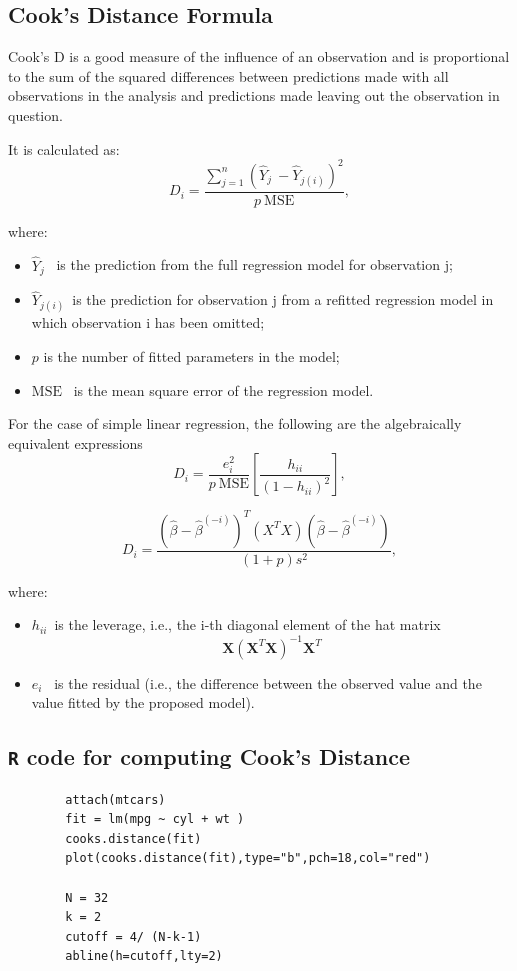 \documentclass[residuals.tex]{subfiles}
\begin{document}
	\subsection*{Cook's Distance Formula}
	Cook's D is a good measure of the influence of an observation and is proportional to the sum of the squared differences 
	between predictions made with all observations in the analysis and predictions made leaving out the observation in question.
	
	It is calculated as:
	\[D_i = \frac{ \sum_{j=1}^n (\hat Y_j\ - \hat Y_{j(i)})^2 }{p \ \mathrm{MSE}},
	\]
	
	where:
	\begin{itemize}
		\item $\hat Y_j$ \, is the prediction from the full regression model for observation j;
		\item $\hat Y_{j(i)}$\, is the prediction for observation j from a refitted regression model in which observation i has been omitted;
		\item $p$ is the number of fitted parameters in the model;
		\item $\mathrm{MSE} $ \, is the mean square error of the regression model.
		
	\end{itemize}
	\bigskip
	For the case of simple linear regression, the following are the algebraically equivalent expressions 
	\[D_i = \frac{e_i^2}{p \ \mathrm{MSE}}\left[\frac{h_{ii}}{(1-h_{ii})^2}\right],
	\]
	
	\[
	D_i = \frac{ (\hat \beta - \hat {\beta}^{(-i)})^T(X^TX)(\hat \beta - \hat {\beta}^{(-i)}) } {(1+p)s^2},
	\]
	
	where:
	\begin{itemize}
		\item $h_{ii} \,$ is the leverage, i.e., the i-th diagonal element of the hat matrix  \[\mathbf{X}\left(\mathbf{X}^T\mathbf{X}\right)^{-1}\mathbf{X}^T\]
		\item $e_i$ \, is the residual (i.e., the difference between the observed value and the value fitted by the proposed model).
	\end{itemize}
	
	
	\bigskip
	
	
	\bigskip
	\subsection*{ \texttt{R} code for computing Cook's Distance}	
	\begin{framed}
		\begin{verbatim}
		attach(mtcars)
		fit = lm(mpg ~ cyl + wt )
		cooks.distance(fit)
		plot(cooks.distance(fit),type="b",pch=18,col="red")
		
		N = 32
		k = 2
		cutoff = 4/ (N-k-1)
		abline(h=cutoff,lty=2)
		\end{verbatim}
	\end{framed}
	
\end{document}
